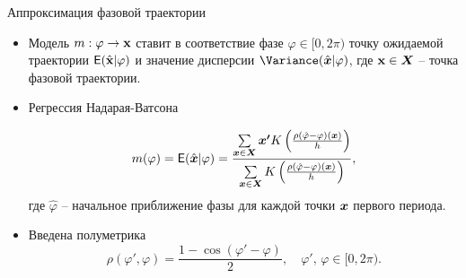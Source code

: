 \documentclass{beamer}
\def\vec#1{\mathchoice{\mbox{\boldmath$\displaystyle#1$}}
{\mbox{\boldmath$\textstyle#1$}} {\mbox{\boldmath$\scriptstyle#1$}} {\mbox{\boldmath$\scriptscriptstyle#1$}}}
\begin{document}
\begin{frame}{Аппроксимация фазовой траектории}

\begin{itemize}
    \item[] Модель $m: \varphi \rightarrow \mbox{\bfseries x}$ ставит в соответствие фазе $\varphi \in [0, 2\pi)$ точку ожидаемой траектории $\mathsf{E}(\hat{\mbox{\bfseries x}}|\varphi)$ и значение дисперсии $\Variance(\hat{\vec{x}}|\varphi)$, где $\mbox{\bfseries x}\in\vec{X}$ -- точка фазовой траектории. 
    \item[] Регрессия Надарая-Ватсона 

    \[ m(\varphi) = \mathsf{E}(\hat{\vec{x}}|\varphi) =\frac{\sum\limits_{\vec{x}\in \vec{X}}\vec{x'}K\left(\frac{\rho(\hat{\varphi} - \varphi)(\vec{x})}{h}\right)}{\sum\limits_{\vec{x}\in \vec{X}}K\left(\frac{\rho(\hat{\varphi} - \varphi)(\vec{x})}{h}\right)},  \]
    где $\hat{\varphi}$ -- начальное приближение фазы для каждой точки $\vec{x}$ первого периода.  
    
    
    \item[] Введена полуметрика
    \[ \rho(\varphi', \varphi) =
    \frac{1 - \cos(\varphi' - \varphi)}{2}, \quad \varphi',\, \varphi \in [0, 2\pi).\]
\end{itemize}



\end{frame}
\end{document}

